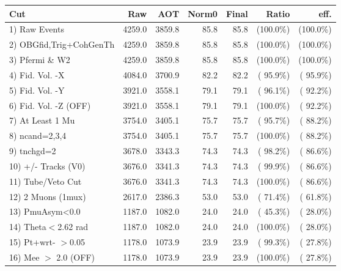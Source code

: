  \begin{table}[h!]\centering
 \begin{tabular}{||l||r|r|r|r|r|r||}
 \hline
 \hline
 Cut & Raw & AOT & Norm0 & Final & Ratio & eff.       \\
 \hline
  1) Raw Events           &       4259.0 &       3859.8 &         85.8 &         85.8 & (100.0\%) & (100.0\%) \\
  2) OBGfid,Trig+CohGenTh &       4259.0 &       3859.8 &         85.8 &         85.8 & (100.0\%) & (100.0\%) \\
  3) Pfermi \& W2         &       4259.0 &       3859.8 &         85.8 &         85.8 & (100.0\%) & (100.0\%) \\
  4) Fid. Vol. -X         &       4084.0 &       3700.9 &         82.2 &         82.2 & ( 95.9\%) & ( 95.9\%) \\
  5) Fid. Vol. -Y         &       3921.0 &       3558.1 &         79.1 &         79.1 & ( 96.1\%) & ( 92.2\%) \\
  6) Fid. Vol. -Z (OFF)   &       3921.0 &       3558.1 &         79.1 &         79.1 & (100.0\%) & ( 92.2\%) \\
  7) At Least 1 Mu        &       3754.0 &       3405.1 &         75.7 &         75.7 & ( 95.7\%) & ( 88.2\%) \\
  8) ncand=2,3,4          &       3754.0 &       3405.1 &         75.7 &         75.7 & (100.0\%) & ( 88.2\%) \\
  9) tnchgd=2             &       3678.0 &       3343.3 &         74.3 &         74.3 & ( 98.2\%) & ( 86.6\%) \\
 10) +/- Tracks (V0)      &       3676.0 &       3341.3 &         74.3 &         74.3 & ( 99.9\%) & ( 86.6\%) \\
 11) Tube/Veto Cut        &       3676.0 &       3341.3 &         74.3 &         74.3 & (100.0\%) & ( 86.6\%) \\
 12) 2 Muons (1mux)       &       2617.0 &       2386.3 &         53.0 &         53.0 & ( 71.4\%) & ( 61.8\%) \\
 13) PmuAsym<0.0          &       1187.0 &       1082.0 &         24.0 &         24.0 & ( 45.3\%) & ( 28.0\%) \\
 14) Theta$<$2.62 rad     &       1187.0 &       1082.0 &         24.0 &         24.0 & (100.0\%) & ( 28.0\%) \\
 15) Pt+wrt- $>$0.05      &       1178.0 &       1073.9 &         23.9 &         23.9 & ( 99.3\%) & ( 27.8\%) \\
 16) Mee $>$ 2.0  (OFF)   &       1178.0 &       1073.9 &         23.9 &         23.9 & (100.0\%) & ( 27.8\%) \\

\end{tabular}
\end{table}
